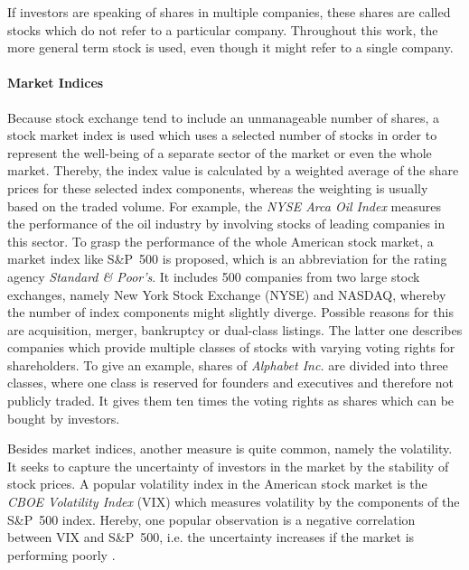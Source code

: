 If investors are speaking of shares in multiple companies, these shares are called stocks which do not refer to a particular company. Throughout this work, the more general term stock is used, even though it might refer to a single company.

\paragraph{Market Indices}
Because stock exchange tend to include an unmanageable number of shares, a stock market index is used which uses a selected number of stocks in order to represent the well-being of a separate sector of the market or even the whole market. Thereby, the index value is calculated by a weighted average of the share prices for these selected index components, whereas the weighting is usually based on the traded volume. For example, the \emph{NYSE Arca Oil Index} measures the performance of the oil industry by involving stocks of leading companies in this sector. To grasp the performance of the whole American stock market, a market index like S\&P~500 is proposed, which is an abbreviation for the rating agency \emph{Standard \& Poor's}. It includes 500 companies from two large stock exchanges, namely New York Stock Exchange (NYSE) and NASDAQ, whereby the number of index components might slightly diverge. Possible reasons for this are acquisition, merger, bankruptcy or dual-class listings. The latter one describes companies which provide multiple classes of stocks with varying voting rights for shareholders. To give an example, shares of \emph{Alphabet Inc.} are divided into three classes, where one class is reserved for founders and executives and therefore not publicly traded. It gives them ten times the voting rights as shares which can be bought by investors.

Besides market indices, another measure is quite common, namely the volatility. It seeks to capture the uncertainty of investors in the market by the stability of stock prices. A popular volatility index in the American stock market is the \emph{CBOE Volatility Index} (VIX) which measures volatility by the components of the S\&P~500 index. Hereby, one popular observation is a negative correlation between VIX and S\&P~500, i.e. the uncertainty increases if the market is performing poorly \cite{Fleming1995PredictingMeasure}.


